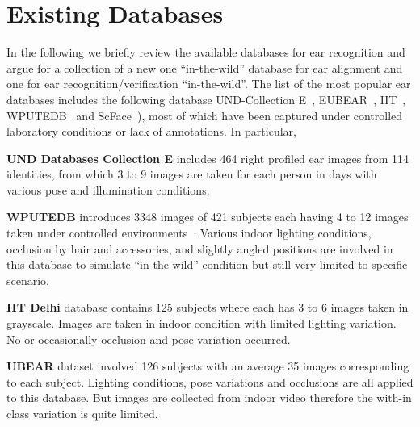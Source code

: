 







\section{Existing Databases}

In the following we briefly review the available databases for ear recognition and argue for a collection of a new one ``in-the-wild'' database for ear alignment and one for ear recognition/verification ``in-the-wild''. 
The list of the most popular ear databases includes the following database UND-Collection E~\cite{UNDE}, EUBEAR~\cite{raposo2011ubear}, IIT~\cite{kumar2012automated}, WPUTEDB~\cite{frejlichowski2010west} and ScFace~\cite{grgic2011scface}), most of which have been captured under controlled laboratory conditions or lack of annotations. In particular, 

\noindent\textbf{UND Databases Collection E} includes 464 right profiled ear images from 114 identities, from which 3 to 9 images are taken for each person in days with various pose and illumination conditions.

\noindent\textbf{WPUTEDB} introduces 3348 images of 421 subjects each having 4 to 12 images taken under controlled environments~\cite{frejlichowski2010west}. Various indoor lighting conditions, occlusion by hair and accessories, and slightly angled positions are involved in this database to simulate ``in-the-wild'' condition but still very limited to specific scenario. 

\noindent\textbf{IIT Delhi} database contains 125 subjects where each has 3 to 6 images taken in grayscale. Images are taken in indoor condition with limited lighting variation. No or occasionally occlusion and pose variation occurred.

\noindent\textbf{UBEAR} dataset involved 126 subjects with an average 35 images corresponding to each subject. Lighting conditions, pose variations and occlusions are all applied to this database. But images are collected from indoor video therefore the with-in class variation is quite limited.

